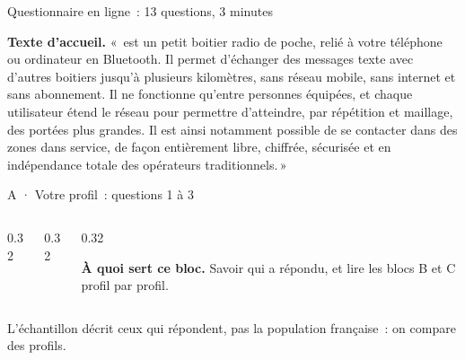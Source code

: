 \begin{frame}{Questionnaire en ligne~: 13 questions, 3 minutes}
  \begin{pcompact}\footnotesize
    \textbf{Texte d'accueil.} «\,\nomproduit{} est un petit boitier radio de poche, relié à votre téléphone ou ordinateur en Bluetooth. Il permet d’échanger des messages texte avec d’autres boitiers jusqu'à plusieurs kilomètres, sans réseau mobile, sans internet et sans abonnement. Il ne fonctionne qu’entre personnes équipées, et chaque utilisateur étend le réseau pour permettre d'atteindre, par répétition et maillage, des portées plus grandes. Il est ainsi notamment possible de se contacter dans des zones dans service, de façon entièrement libre, chiffrée, sécurisée et en indépendance totale des opérateurs traditionnels.\,»
  \end{pcompact}
\end{frame}

\begin{frame}{A · Votre profil~: questions 1 à 3}
  \begin{columns}[T]
    \begin{column}{0.32\textwidth}
    \end{column}
    \begin{column}{0.32\textwidth}
    \end{column}
    \begin{column}{0.32\textwidth}
      \vspace{0.12cm}
      \begin{carte}[height=1.18cm,valign=top]
        \raggedright{\scriptsize\textbf{\color{insarouge}À quoi sert ce bloc.} Savoir qui a répondu, et lire les blocs B et C profil par profil.\par}
      \end{carte}
    \end{column}
  \end{columns}
  \vspace{0.15cm}
  \begin{pcompact}\centering\footnotesize
    L'échantillon décrit ceux qui répondent, pas la population française~: on compare des profils.
  \end{pcompact}
\end{frame}

